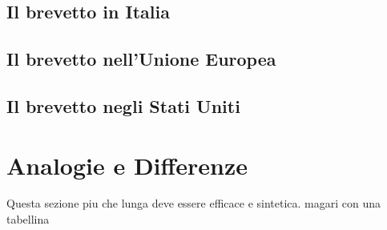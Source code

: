 \subsection{Il brevetto in Italia}
\subsection{Il brevetto nell'Unione Europea}
\subsection{Il brevetto negli Stati Uniti}
\section{Analogie e Differenze}
Questa sezione piu che lunga deve essere efficace e sintetica. magari con una tabellina
